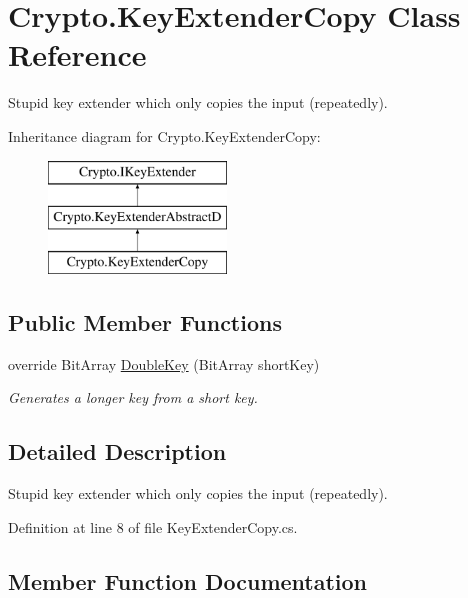 \hypertarget{class_crypto_1_1_key_extender_copy}{}\section{Crypto.\+Key\+Extender\+Copy Class Reference}
\label{class_crypto_1_1_key_extender_copy}


Stupid key extender which only copies the input (repeatedly).  


Inheritance diagram for Crypto.\+Key\+Extender\+Copy\+:\begin{figure}[H]
\begin{center}
\leavevmode
\includegraphics[height=3.000000cm]{class_crypto_1_1_key_extender_copy}
\end{center}
\end{figure}
\subsection*{Public Member Functions}
\begin{DoxyCompactItemize}
\item 
override Bit\+Array \hyperlink{class_crypto_1_1_key_extender_copy_ab57d10f5c80bbf6ab395e0a0b690080a}{Double\+Key} (Bit\+Array short\+Key)
\begin{DoxyCompactList}\small\item\em Generates a longer key from a short key. \end{DoxyCompactList}\end{DoxyCompactItemize}


\subsection{Detailed Description}
Stupid key extender which only copies the input (repeatedly). 



Definition at line 8 of file Key\+Extender\+Copy.\+cs.



\subsection{Member Function Documentation}
\hypertarget{class_crypto_1_1_key_extender_copy_ab57d10f5c80bbf6ab395e0a0b690080a}{}
